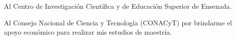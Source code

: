 
\hspace{12pt}
\bigskip

Al Centro de Investigación Científica y de Educación Superior de Ensenada.
\bigskip

Al Consejo Nacional de Ciencia y Tecnología (CONACyT) por brindarme el apoyo econ\'omico para realizar mis estudios de \newline maestría.
